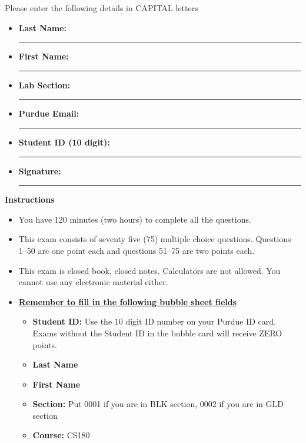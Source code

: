 \documentclass[CS180-F16-FinalExam.tex]{subfiles}
\begin{document}
 
Please enter the following details in CAPITAL letters
\begin{itemize}
\item \textbf{Last Name:} \noindent\rule{8cm}{0.4pt}
\item \textbf{First Name:} \noindent\rule{8cm}{0.4pt}
\item \textbf{Lab Section:} \noindent\rule{8cm}{0.4pt}
\item \textbf{Purdue Email:} \noindent\rule{8cm}{0.4pt}
\item \textbf{Student ID (10 digit):} \noindent\rule{8cm}{0.4pt}
\item \textbf{Signature:} \noindent\rule{8cm}{0.4pt}
\end{itemize}

\begin{mdframed}[style=MyFrame]
\begin{center}\textbf{Instructions}\end{center}
\begin{itemize}
\item You have 120 minutes (two hours) to complete all the questions.
\item  This exam consists of seventy five (75) multiple choice questions. Questions 1--50 are one point each and questions 51--75 are two points each.
\item This exam is closed book, closed notes. Calculators are not allowed. You cannot use any electronic material either.

\item \textbf{\underline{Remember to fill in the following bubble sheet fields}}
\begin{itemize}
\item \textbf{Student ID:} Use the 10 digit ID number on your Purdue ID card. Exams without the Student ID in the bubble card will receive ZERO points.
\item \textbf{Last Name} 
\item \textbf{First Name}
\item \textbf{Section:} Put 0001 if you are in BLK section, 0002 if you are in GLD section
\item \textbf{Course:} CS180
\end{itemize}
\end{itemize}
\end{mdframed}
\end{document}
